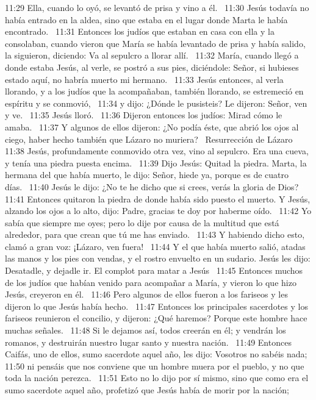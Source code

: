 11:29 Ella, cuando lo oyó, se levantó de prisa y vino a él.  
11:30 Jesús todavía no había entrado en la aldea, sino que estaba en el lugar donde Marta le había encontrado.  
11:31 Entonces los judíos que estaban en casa con ella y la consolaban, cuando vieron que María se había levantado de prisa y había salido, la siguieron, diciendo: Va al sepulcro a llorar allí.  
11:32 María, cuando llegó a donde estaba Jesús, al verle, se postró a sus pies, diciéndole: Señor, si hubieses estado aquí, no habría muerto mi hermano.  
11:33 Jesús entonces, al verla llorando, y a los judíos que la acompañaban, también llorando, se estremeció en espíritu y se conmovió,  
11:34 y dijo: ¿Dónde le pusisteis? Le dijeron: Señor, ven y ve.  
11:35 Jesús lloró.  
11:36 Dijeron entonces los judíos: Mirad cómo le amaba.  
11:37 Y algunos de ellos dijeron: ¿No podía éste, que abrió los ojos al ciego, haber hecho también que Lázaro no muriera?  
Resurrección de Lázaro  
11:38 Jesús, profundamente conmovido otra vez, vino al sepulcro. Era una cueva, y tenía una piedra puesta encima.  
11:39 Dijo Jesús: Quitad la piedra. Marta, la hermana del que había muerto, le dijo: Señor, hiede ya, porque es de cuatro días.  
11:40 Jesús le dijo: ¿No te he dicho que si crees, verás la gloria de Dios? 
11:41 Entonces quitaron la piedra de donde había sido puesto el muerto. Y Jesús, alzando los ojos a lo alto, dijo: Padre, gracias te doy por haberme oído.  
11:42 Yo sabía que siempre me oyes; pero lo dije por causa de la multitud que está alrededor, para que crean que tú me has enviado.  
11:43 Y habiendo dicho esto, clamó a gran voz: ¡Lázaro, ven fuera!  
11:44 Y el que había muerto salió, atadas las manos y los pies con vendas, y el rostro envuelto en un sudario. Jesús les dijo: Desatadle, y dejadle ir. 
El complot para matar a Jesús   
11:45 Entonces muchos de los judíos que habían venido para acompañar a María, y vieron lo que hizo Jesús, creyeron en él.  
11:46 Pero algunos de ellos fueron a los fariseos y les dijeron lo que Jesús había hecho.  
11:47 Entonces los principales sacerdotes y los fariseos reunieron el concilio, y dijeron: ¿Qué haremos? Porque este hombre hace muchas señales.  
11:48 Si le dejamos así, todos creerán en él; y vendrán los romanos, y destruirán nuestro lugar santo y nuestra nación.  
11:49 Entonces Caifás, uno de ellos, sumo sacerdote aquel año, les dijo: Vosotros no sabéis nada;  
11:50 ni pensáis que nos conviene que un hombre muera por el pueblo, y no que toda la nación perezca.  
11:51 Esto no lo dijo por sí mismo, sino que como era el sumo sacerdote aquel año, profetizó que Jesús había de morir por la nación;  
